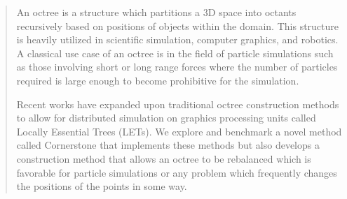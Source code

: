 \begin{abstract}

An octree is a structure which partitions a 3D space into octants recursively based on positions of objects within the domain. This structure is heavily utilized in scientific simulation, computer graphics, and robotics. A classical use case of an octree is in the field of particle simulations such as those involving short or long range forces where the number of particles required is large enough to become prohibitive for the simulation. 

Recent works have expanded upon traditional octree construction methods to allow for distributed simulation on graphics processing units called Locally Essential Trees (LETs). We explore and benchmark a novel method called Cornerstone that implements these methods but also develops a construction method that allows an octree to be rebalanced which is favorable for particle simulations or any problem which frequently changes the positions of the points in some way.

\end{abstract}
